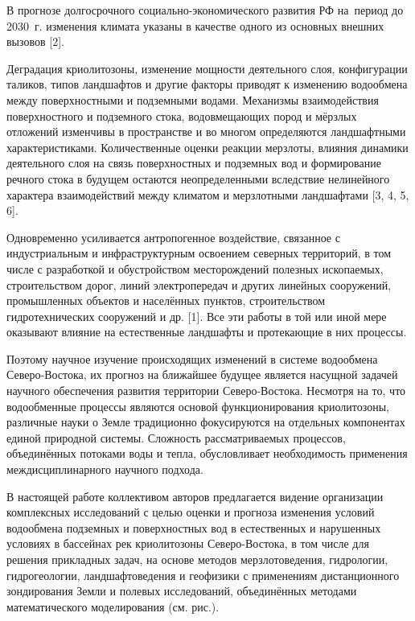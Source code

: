  

\makeProcTitle
{}

В прогнозе долгосрочного социально-экономического развития РФ на~период до 2030~г. изменения климата указаны в качестве одного из основных внешних вызовов [2].

Деградация криолитозоны, изменение мощности деятельного слоя, конфигурации таликов, типов ландшафтов и другие факторы приводят к изменению водообмена между поверхностными и подземными водами. Механизмы взаимодействия поверхностного и подземного стока, водовмещающих пород и мёрзлых отложений изменчивы в пространстве и во многом определяются ландшафтными характеристиками. Количественные оценки реакции мерзлоты, влияния динамики деятельного слоя на связь поверхностных и подземных вод и формирование речного стока в будущем остаются неопределенными вследствие нелинейного характера взаимодействий между климатом и мерзлотными ландшафтами [3, 4, 5, 6].

Одновременно усиливается антропогенное воздействие, связанное с индустриальным и инфраструктурным освоением северных территорий, в том числе с разработкой и обустройством месторождений полезных ископаемых, строительством дорог, линий электропередач и других линейных сооружений, промышленных объектов и населённых пунктов, строительством гидротехнических сооружений и др. [1]. Все эти работы в той или иной мере оказывают влияние на естественные ландшафты и протекающие в них процессы.

Поэтому научное изучение происходящих изменений в системе водообмена Северо-Востока, их прогноз на ближайшее будущее является насущной задачей научного обеспечения развития территории Северо-Востока. Несмотря на то, что водообменные процессы являются основой функционирования криолитозоны, различные науки о Земле традиционно фокусируются на отдельных компонентах единой природной системы. Сложность рассматриваемых процессов, объединённых потоками воды и тепла, обусловливает необходимость применения междисциплинарного научного подхода.

В настоящей работе коллективом авторов предлагается видение организации комплексных исследований с целью оценки и прогноза изменения условий водообмена подземных и поверхностных вод в естественных и нарушенных условиях в бассейнах рек криолитозоны Северо-Востока, в том числе для решения прикладных задач, на основе методов мерзлотоведения, гидрологии, гидрогеологии, ландшафтоведения и геофизики с применениям дистанционного зондирования Земли и полевых исследований, объединённых методами математического моделирования (см. рис.).
\clearpage



